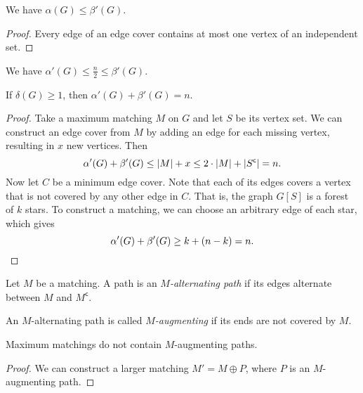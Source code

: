 \begin{trditev}
We have $\alpha(G) \leq \beta'(G)$.
\end{trditev}

\begin{proof}
Every edge of an edge cover contains at most one vertex of an
independent set.
\end{proof}

\begin{trditev}
We have $\alpha'(G) \leq \frac{n}{2} \leq \beta'(G)$.
\end{trditev}

\obvs

\begin{izrek}[Gallai]
If $\delta(G) \geq 1$, then $\alpha'(G) + \beta'(G) = n$.
\end{izrek}

\begin{proof}
Take a maximum matching $M$ on $G$ and let $S$ be its vertex set.
We can construct an edge cover from $M$ by adding an edge for each
missing vertex, resulting in $x$ new vertices. Then
\[
\alpha'(G) + \beta'(G) \leq
\left\lvert M\right\rvert + x \leq
2 \cdot \left\lvert M\right\rvert + \left\lvert S^{\mathsf{c}}\right\rvert =
n.
\]
Now let $C$ be a minimum edge cover. Note that each of its edges
covers a vertex that is not covered by any other edge in $C$. That
is, the graph $G[S]$ is a forest of $k$ stars. To construct a
matching, we can choose an arbitrary edge of each star, which gives
\[
\alpha'(G) + \beta'(G) \geq k + (n-k) = n. \qedhere
\]
\end{proof}

\begin{definicija}
Let $M$ be a matching. A path is an
\emph{$M$-alternating path} if its
edges alternate between $M$ and $M^{\mathsf{c}}$.
\end{definicija}

\begin{definicija}
An $M$-alternating path is called
\emph{$M$-augmenting} if its ends are
not covered by $M$.
\end{definicija}


\begin{trditev}
\label{mtch:prop:max_aug}
Maximum matchings do not contain $M$-augmenting paths.
\end{trditev}

\begin{proof}
We can construct a larger matching $M' = M \oplus P$, where $P$ is
an $M$-augmenting path.
\end{proof}

